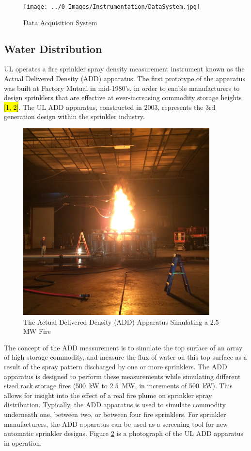 \documentclass{article}
\begin{document}
\begin{figure}[H]
	\centering
	\texttt{[image: ../0\_Images/Instrumentation/DataSystem.jpg]}
	\caption{Data Acquisition System}
	\label{fig:DataSystem}
\end{figure}

\clearpage

\subsection{Water Distribution}

UL operates a fire sprinkler spray density measurement instrument known as the Actual Delivered Density (ADD) apparatus. The first prototype of the apparatus was built at Factory Mutual in mid-1980’s, in order to enable manufacturers to design sprinklers that are effective at ever-increasing commodity storage heights \hl{[1, 2]}. The UL ADD apparatus, constructed in 2003, represents the 3rd generation design within the sprinkler industry. 
 
\begin{figure}[!ht]
	\centering
	\includegraphics[width=4in]{Figures/Water_Distribution/ADD.jpg}
	\caption{The Actual Delivered Density (ADD) Apparatus Simulating a 2.5 MW Fire}
	\label{fig:ADD_Apparatus_Simulating_fire}
\end{figure}

The concept of the ADD measurement is to simulate the top surface of an array of high storage commodity, and measure the flux of water on this top surface as a result of the spray pattern discharged by one or more sprinklers. The ADD apparatus is designed to perform these measurements while simulating different sized rack storage fires (500~kW to 2.5~MW, in increments of 500~kW). This allows for insight into the effect of a real fire plume on sprinkler spray distribution. Typically, the ADD apparatus is used to simulate commodity underneath one, between two, or between four fire sprinklers. For sprinkler manufacturers, the ADD apparatus can be used as a screening tool for new automatic sprinkler designs. Figure \ref{fig:ADD_Apparatus_Simulating_fire} is a photograph of the UL ADD apparatus in operation.
\end{document}
